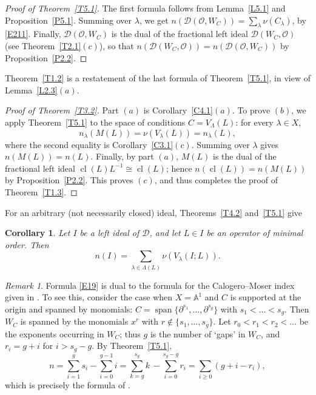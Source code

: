 \documentclass[11pt,reqno]{amsart}
\theoremstyle{plain}
\newtheorem{corollary}{Corollary}[section]
\theoremstyle{definition}
\theoremstyle{remark}
\newtheorem*{remark}{Remark}
\numberwithin{equation}{section}
\newcommand{\cD}{\mathcal{D}}
\newcommand{\cO}{\mathcal{O}}
\newcommand{\A}{\mathbb{A}}
\newcommand{\del}{\partial}
\DeclareMathOperator{\cl}{cl}
\DeclareMathOperator{\spn}{span}
\begin{document}
\begin{proof}[Proof of Theorem~\ref{T5.1}]
The first formula follows from Lemma~\ref{L5.1} and Proposition~\ref{P5.1}. Summing over
$\lambda$, we get $n(\cD(\cO, W_C)) = \sum_\lambda \nu(C_\lambda)$, by \eqref{E211}. Finally,
$\cD(\cO, W_C)$ is the dual of the fractional left ideal $\cD(W_C, \cO)$ (see
Theorem~\ref{T2.1}$(c)$), so that $n(\cD(W_C, \cO)) = n(\cD(\cO, W_C))$ by
Proposition~\ref{P2.2}.
\end{proof}

Theorem~\ref{T1.2} is a restatement of the last formula of Theorem~\ref{T5.1}, in view of
Lemma~\ref{L2.3}$(a)$.

\begin{proof}[Proof of Theorem~\ref{T3.2}]
Part $(a)$ is Corollary~\ref{C4.1}$(a)$. To prove $(b)$, we apply Theorem~\ref{T5.1} to the space
of conditions $C = V_\Lambda(L)$: for every $\lambda \in X$,
\[
  n_\lambda(M(L)) = \nu(V_\lambda(L)) = n_\lambda(L) ,
\]
where the second equality is Corollary~\ref{C3.1}$(c)$. Summing over $\lambda$ gives $n(M(L)) =
n(L)$. Finally, by part $(a)$, $M(L)$ is the dual of the fractional left ideal
$\cl(L) L^{-1} \cong \cl(L)$; hence $n(\cl(L)) = n(M(L))$ by Proposition~\ref{P2.2}. This proves
$(c)$, and thus completes the proof of Theorem~\ref{T1.3}.
\end{proof}

For an arbitrary (not necessarily closed) ideal, Theorems~\ref{T4.2} and~\ref{T5.1} give

\begin{corollary}
\label{C5.1}
Let $I$ be a left ideal of $\cD$, and let $L \in I$ be an operator of minimal order. Then
\[
  n(I) = \sum_{\lambda \in \Lambda(L)} \nu(V_\lambda(I;L)) .
\]
\end{corollary}

\begin{remark}
Formula \eqref{E19} is dual to the formula for the Calogero--Moser index given in
\cite[(8.3)]{BerestWilson04}. To see this, consider the case when $X = \A^1$ and $C$ is supported
at the origin and spanned by monomials: $C = \spn\{\del^{s_1}, \ldots, \del^{s_g}\}$ with
$s_1 < \ldots < s_g$. Then $W_C$ is spanned by the monomials $x^r$ with $r \notin \{s_1, \ldots,
s_g\}$. Let $r_0 < r_1 < r_2 < \ldots$ be the exponents occurring in $W_C$; thus $g$ is the number
of `gaps' in $W_C$, and $r_i = g + i$ for $i > s_g - g$. By Theorem~\ref{T5.1},
\[
  n = \sum_{i=1}^g s_i - \sum_{i=0}^{g-1} i = \sum_{k=g}^{s_g} k \, - \sum_{i=0}^{s_g - g} r_i =
  \sum_{i \ge 0} (g + i - r_i) ,
\]
which is precisely the formula of \cite{BerestWilson04}.
\end{remark}
\end{document}
